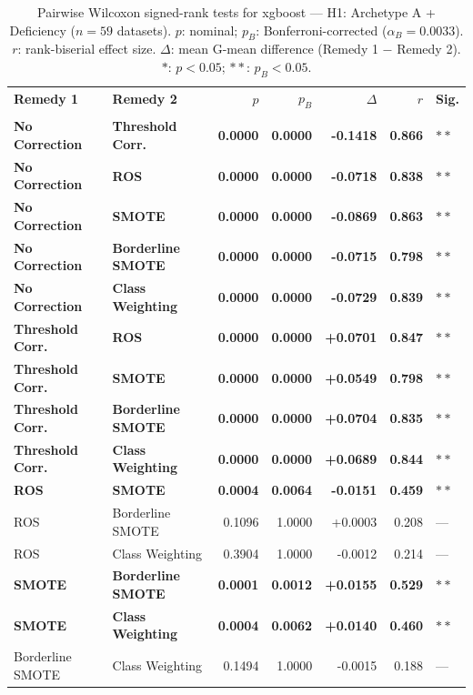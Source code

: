 \begin{table}[ht]
\centering
\scriptsize
\caption{Pairwise Wilcoxon signed-rank tests for xgboost --- H1: Archetype A + Deficiency ($n=59$ datasets). $p$: nominal; $p_B$: Bonferroni-corrected ($\alpha_B=0.0033$). $r$: rank-biserial effect size. $\Delta$: mean G-mean difference (Remedy 1 $-$ Remedy 2). $\ast$: $p<0.05$; $\ast\ast$: $p_B<0.05$.}
\label{tab:wilcoxon_xgboost_h1}
\begin{tabular}{llrrrrl}
\toprule
\textbf{Remedy 1} & \textbf{Remedy 2} & \textbf{$p$} & \textbf{$p_B$} & \textbf{$\Delta$} & \textbf{$r$} & \textbf{Sig.} \\\\
\midrule
    \textbf{No Correction} & \textbf{Threshold Corr.} & \textbf{0.0000} & \textbf{0.0000} & \textbf{-0.1418} & \textbf{0.866} & $\ast\ast$ \\
    \textbf{No Correction} & \textbf{ROS} & \textbf{0.0000} & \textbf{0.0000} & \textbf{-0.0718} & \textbf{0.838} & $\ast\ast$ \\
    \textbf{No Correction} & \textbf{SMOTE} & \textbf{0.0000} & \textbf{0.0000} & \textbf{-0.0869} & \textbf{0.863} & $\ast\ast$ \\
    \textbf{No Correction} & \textbf{Borderline SMOTE} & \textbf{0.0000} & \textbf{0.0000} & \textbf{-0.0715} & \textbf{0.798} & $\ast\ast$ \\
    \textbf{No Correction} & \textbf{Class Weighting} & \textbf{0.0000} & \textbf{0.0000} & \textbf{-0.0729} & \textbf{0.839} & $\ast\ast$ \\
    \textbf{Threshold Corr.} & \textbf{ROS} & \textbf{0.0000} & \textbf{0.0000} & \textbf{+0.0701} & \textbf{0.847} & $\ast\ast$ \\
    \textbf{Threshold Corr.} & \textbf{SMOTE} & \textbf{0.0000} & \textbf{0.0000} & \textbf{+0.0549} & \textbf{0.798} & $\ast\ast$ \\
    \textbf{Threshold Corr.} & \textbf{Borderline SMOTE} & \textbf{0.0000} & \textbf{0.0000} & \textbf{+0.0704} & \textbf{0.835} & $\ast\ast$ \\
    \textbf{Threshold Corr.} & \textbf{Class Weighting} & \textbf{0.0000} & \textbf{0.0000} & \textbf{+0.0689} & \textbf{0.844} & $\ast\ast$ \\
    \textbf{ROS} & \textbf{SMOTE} & \textbf{0.0004} & \textbf{0.0064} & \textbf{-0.0151} & \textbf{0.459} & $\ast\ast$ \\
    ROS & Borderline SMOTE & 0.1096 & 1.0000 & +0.0003 & 0.208 & --- \\
    ROS & Class Weighting & 0.3904 & 1.0000 & -0.0012 & 0.214 & --- \\
    \textbf{SMOTE} & \textbf{Borderline SMOTE} & \textbf{0.0001} & \textbf{0.0012} & \textbf{+0.0155} & \textbf{0.529} & $\ast\ast$ \\
    \textbf{SMOTE} & \textbf{Class Weighting} & \textbf{0.0004} & \textbf{0.0062} & \textbf{+0.0140} & \textbf{0.460} & $\ast\ast$ \\
    Borderline SMOTE & Class Weighting & 0.1494 & 1.0000 & -0.0015 & 0.188 & --- \\
\bottomrule
\end{tabular}
\end{table}